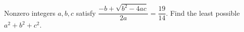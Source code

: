 Nonzero integers $a,b,c$ satisfy $\dfrac{-b+\sqrt{b^2-4ac}}{2a}=\dfrac{19}{14}$. Find the least possible $a^2+b^2+c^2$.
